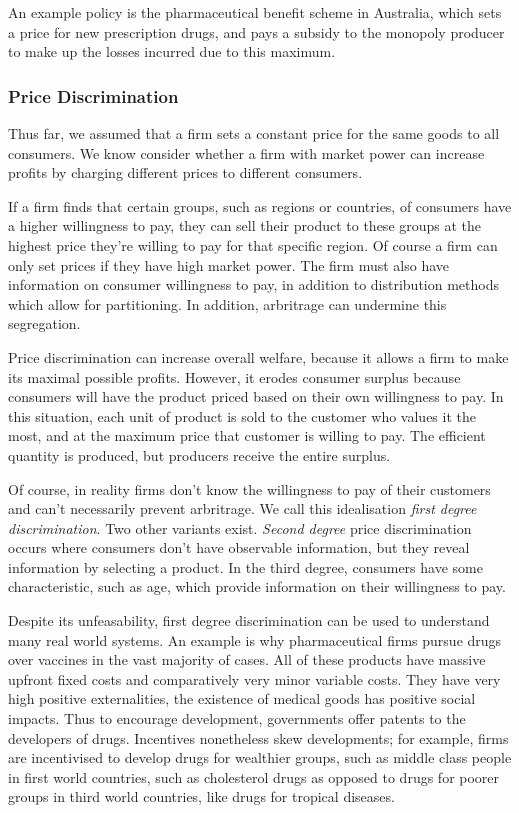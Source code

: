 \documentclass[12pt]{report}
\begin{document}
\begin{flushleft}
An example policy is the pharmaceutical benefit scheme in Australia, which sets
a price for new prescription drugs, and pays a subsidy to the monopoly producer
to make up the losses incurred due to this maximum.

\subsubsection*{Price Discrimination}
Thus far, we assumed that a firm sets a constant price for the same goods to 
all consumers. We know consider whether a firm with market power can increase
profits by charging different prices to different consumers.

\bigskip
If a firm finds that certain groups, such as regions or countries, of consumers
have a higher willingness to pay, they can sell their product to these groups 
at the highest price they're willing to pay for that specific region. Of course
a firm can only set prices if they have high market power. The firm must also
have information on consumer willingness to pay, in addition to distribution
methods which allow for partitioning. In addition, arbritrage can undermine 
this segregation.

\bigskip
Price discrimination can increase overall welfare, because it allows a firm to
make its maximal possible profits. However, it erodes consumer surplus because
consumers will have the product priced based on their own willingness to pay.
In this situation, each unit of product is sold to the customer who values it
the most, and at the maximum price that customer is willing to pay. The 
efficient quantity is produced, but producers receive the entire surplus.

\bigskip
Of course, in reality firms don't know the willingness to pay of their 
customers and can't necessarily prevent arbritrage. We call this idealisation
\textit{first degree discrimination}. Two other variants exist. \textit{Second
degree} price discrimination occurs where consumers don't have observable 
information, but they reveal information by selecting a product. In the third
degree, consumers have some characteristic, such as age, which provide 
information on their willingness to pay.

\bigskip
Despite its unfeasability, first degree discrimination can be used to 
understand many real world systems. An example is why pharmaceutical firms
pursue drugs over vaccines in the vast majority of cases. All of these products
have massive upfront fixed costs and comparatively very minor variable costs.
They have very high positive externalities, the existence of medical goods
has positive social impacts. Thus to encourage development, governments offer
patents to the developers of drugs. Incentives nonetheless skew developments;
for example, firms are incentivised to develop drugs for wealthier groups,
such as middle class people in first world countries, such as cholesterol
drugs as opposed to drugs for poorer groups in third world countries, like
drugs for tropical diseases. 


\end{flushleft}
\end{document}
